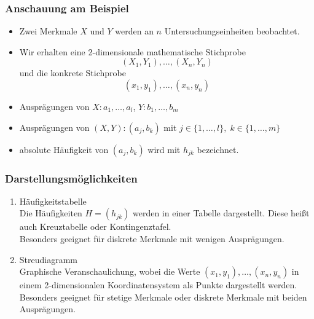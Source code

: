 \subsubsection{Anschauung am Beispiel}
\begin{itemize}
\item Zwei Merkmale $X$ und $Y$ werden an $n$ Untersuchungseinheiten beobachtet.
\item Wir erhalten eine 2-dimensionale mathematische Stichprobe
$$(X_1, Y_1), \ldots , (X_n, Y_n)$$
und die konkrete Stichprobe 
$$(x_1,y_1), \ldots, (x_n,y_n)$$
\item Ausprägungen von $X: a_1, \ldots, a_l$, $Y: b_1, \ldots, b_m$
\item Ausprägungen von $(X,Y): (a_j,b_k)$ mit $j\in\{1,\ldots, l\},\; k \in \{1,\ldots ,m\}$
\item absolute Häufigkeit von $(a_j, b_k)$ wird mit $h_{jk}$ bezeichnet.
\end{itemize}
\subsubsection*{Darstellungsmöglichkeiten}
\begin{enumerate}
\item Häufigkeitstabelle\\
Die Häufigkeiten $H=(h_{jk})$ werden in einer Tabelle dargestellt. Diese heißt auch Kreuztabelle oder Kontingenztafel.\\
Besonders geeignet für diskrete Merkmale mit wenigen Ausprägungen.
\item Streudiagramm\\
Graphische Veranschaulichung, wobei die Werte $(x_1,y_1),\ldots ,(x_n, y_n)$ in einem 2-dimensionalen Koordinatensystem als Punkte dargestellt werden.\\
Besonders geeignet für stetige Merkmale oder diskrete Merkmale mit beiden Ausprägungen.
\end{enumerate}

